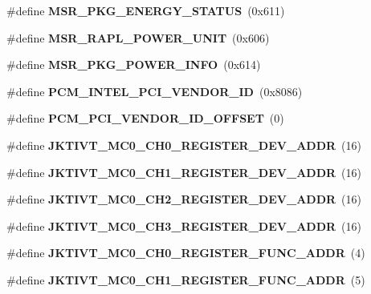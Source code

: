 \begin{DoxyCompactItemize}
\item 
\#define {\bfseries M\+S\+R\+\_\+\+P\+K\+G\+\_\+\+E\+N\+E\+R\+G\+Y\+\_\+\+S\+T\+A\+T\+U\+S}~(0x611)\label{types_8h_ae8952c7da879bc4523085c453d0bf460}

\item 
\#define {\bfseries M\+S\+R\+\_\+\+R\+A\+P\+L\+\_\+\+P\+O\+W\+E\+R\+\_\+\+U\+N\+I\+T}~(0x606)\label{types_8h_a888543788798e9b5a48ecac73b5169c2}

\item 
\#define {\bfseries M\+S\+R\+\_\+\+P\+K\+G\+\_\+\+P\+O\+W\+E\+R\+\_\+\+I\+N\+F\+O}~(0x614)\label{types_8h_a442cae088121674772e8c0dc5ab4d8bf}

\item 
\#define {\bfseries P\+C\+M\+\_\+\+I\+N\+T\+E\+L\+\_\+\+P\+C\+I\+\_\+\+V\+E\+N\+D\+O\+R\+\_\+\+I\+D}~(0x8086)\label{types_8h_ac1d4e070698e66acba029e80c1d4d36e}

\item 
\#define {\bfseries P\+C\+M\+\_\+\+P\+C\+I\+\_\+\+V\+E\+N\+D\+O\+R\+\_\+\+I\+D\+\_\+\+O\+F\+F\+S\+E\+T}~(0)\label{types_8h_a555a8cb40b170bdcf49d2d6b1cd1d368}

\item 
\#define {\bfseries J\+K\+T\+I\+V\+T\+\_\+\+M\+C0\+\_\+\+C\+H0\+\_\+\+R\+E\+G\+I\+S\+T\+E\+R\+\_\+\+D\+E\+V\+\_\+\+A\+D\+D\+R}~(16)\label{types_8h_a7ec9fcd9e4c9625ba4a1f10c91ec6586}

\item 
\#define {\bfseries J\+K\+T\+I\+V\+T\+\_\+\+M\+C0\+\_\+\+C\+H1\+\_\+\+R\+E\+G\+I\+S\+T\+E\+R\+\_\+\+D\+E\+V\+\_\+\+A\+D\+D\+R}~(16)\label{types_8h_a6290255155244c1f6a1613b223e93948}

\item 
\#define {\bfseries J\+K\+T\+I\+V\+T\+\_\+\+M\+C0\+\_\+\+C\+H2\+\_\+\+R\+E\+G\+I\+S\+T\+E\+R\+\_\+\+D\+E\+V\+\_\+\+A\+D\+D\+R}~(16)\label{types_8h_a8850e2fcc2ffe596f04a164ca3207cea}

\item 
\#define {\bfseries J\+K\+T\+I\+V\+T\+\_\+\+M\+C0\+\_\+\+C\+H3\+\_\+\+R\+E\+G\+I\+S\+T\+E\+R\+\_\+\+D\+E\+V\+\_\+\+A\+D\+D\+R}~(16)\label{types_8h_a7ef1d592aa43da255e0faa532f506af1}

\item 
\#define {\bfseries J\+K\+T\+I\+V\+T\+\_\+\+M\+C0\+\_\+\+C\+H0\+\_\+\+R\+E\+G\+I\+S\+T\+E\+R\+\_\+\+F\+U\+N\+C\+\_\+\+A\+D\+D\+R}~(4)\label{types_8h_a34a91902211f34228e7295b2f5a8434f}

\item 
\#define {\bfseries J\+K\+T\+I\+V\+T\+\_\+\+M\+C0\+\_\+\+C\+H1\+\_\+\+R\+E\+G\+I\+S\+T\+E\+R\+\_\+\+F\+U\+N\+C\+\_\+\+A\+D\+D\+R}~(5)\label{types_8h_a30a607d052dd9925ea7fc5c2b1782298}


\end{DoxyCompactItemize}

